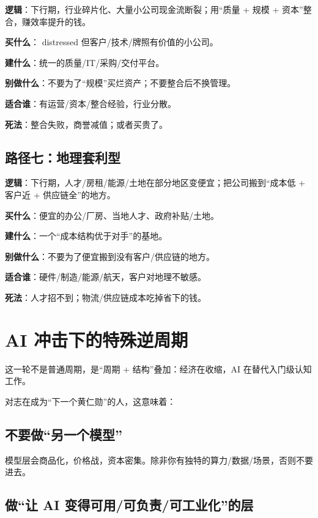 \textbf{逻辑}：下行期，行业碎片化、大量小公司现金流断裂；用``质量 + 规模
+ 资本''整合，赚效率提升的钱。

\textbf{买什么}： distressed 但客户/技术/牌照有价值的小公司。

\textbf{建什么}：统一的质量/IT/采购/交付平台。

\textbf{别做什么}：不要为了``规模''买烂资产；不要整合后不换管理。

\textbf{适合谁}：有运营/资本/整合经验，行业分散。

\textbf{死法}：整合失败，商誉减值；或者买贵了。

\section{路径七：地理套利型}\label{ux8defux5f84ux4e03ux5730ux7406ux5957ux5229ux578b}

\textbf{逻辑}：下行期，人才/房租/能源/土地在部分地区变便宜；把公司搬到``成本低
+ 客户近 + 供应链全''的地方。

\textbf{买什么}：便宜的办公/厂房、当地人才、政府补贴/土地。

\textbf{建什么}：一个``成本结构优于对手''的基地。

\textbf{别做什么}：不要为了便宜搬到没有客户/供应链的地方。

\textbf{适合谁}：硬件/制造/能源/航天，客户对地理不敏感。

\textbf{死法}：人才招不到；物流/供应链成本吃掉省下的钱。

\chapter{AI
冲击下的特殊逆周期}\label{ai-ux51b2ux51fbux4e0bux7684ux7279ux6b8aux9006ux5468ux671f}

这一轮不是普通周期，是``周期 + 结构''叠加：经济在收缩，AI
在替代入门级认知工作。

对志在成为``下一个黄仁勋''的人，这意味着：

\section{不要做``另一个模型''}\label{ux4e0dux8981ux505aux53e6ux4e00ux4e2aux6a21ux578b}

模型层会商品化，价格战，资本密集。除非你有独特的算力/数据/场景，否则不要进去。

\section{做``让 AI
变得可用/可负责/可工业化''的层}\label{ux505aux8ba9-ai-ux53d8ux5f97ux53efux7528ux53efux8d1fux8d23ux53efux5de5ux4e1aux5316ux7684ux5c42}

